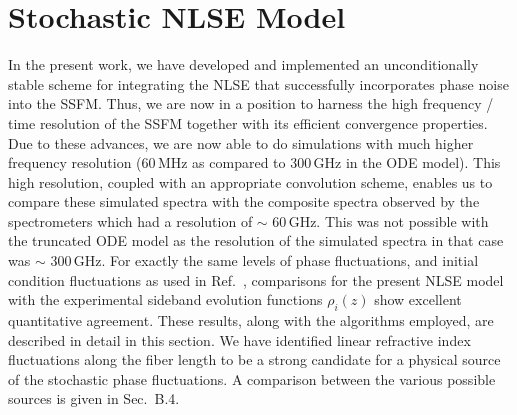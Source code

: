\section{Stochastic NLSE Model}

In the present work, we have developed and implemented an unconditionally 
stable scheme for integrating the NLSE that successfully incorporates phase 
noise into the SSFM. Thus, we are now in a position to harness the high 
frequency / time resolution of the SSFM together with its efficient 
convergence properties. Due to these advances, we are now able to do 
simulations with much higher frequency resolution (60\,MHz as compared to 
300\,GHz in the ODE model). This high resolution, coupled with an appropriate 
convolution scheme, enables us to compare these simulated spectra with the 
composite spectra observed by the spectrometers which had a resolution of 
$\sim$ 60\,GHz. This was not possible with the truncated ODE model as the 
resolution of the simulated spectra in that case was $\sim$ 300\,GHz. For 
exactly the same levels of phase fluctuations, and initial condition 
fluctuations as used in Ref.\ \cite{hart1}, comparisons for the present NLSE 
model with the experimental sideband evolution functions $\rho_i(z)$ show 
excellent quantitative agreement. These results, along with the algorithms 
employed, are described in detail in this section. We have identified linear 
refractive index fluctuations along the fiber length to be a strong candidate 
for a physical source of the stochastic phase fluctuations. A comparison 
between the various possible sources is given in Sec.\ B.4.

